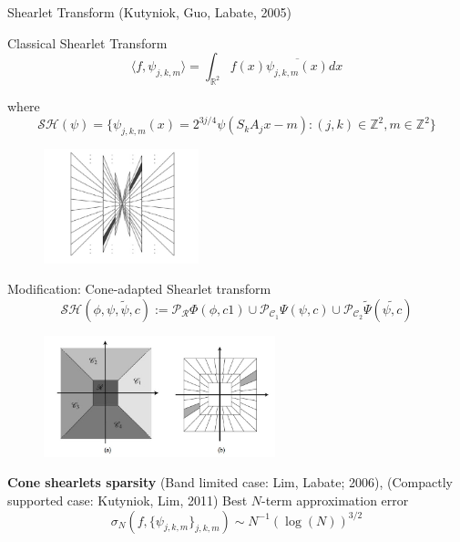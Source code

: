 \begin{frame}{Shearlet Transform (Kutyniok, Guo, Labate, 2005)}
\begin{block}{Classical Shearlet Transform}
$$
\langle f,\psi_{j,k,m}\rangle =\int_{\mathbb{R}^2}f(x)\overline{\psi_{j,k,m}(x)}dx
$$

where
$$
\mathcal{SH}(\psi)=\{\psi_{j,k,m}(x)=2^{3j/4}\psi (S_kA_jx-m):(j,k)\in\mathbb{Z}^2,m\in\mathbb{Z}^2\}
$$
\end{block}

\begin{figure}[h!]
\centering
\includegraphics[width=0.4\textwidth]{./images/tiling_nocone.jpg}
\end{figure}
\end{frame}

\begin{frame}{Modification: Cone-adapted Shearlet transform}
$$
\mathcal{SH}(\phi,\psi,\tilde{\psi},c):=\mathcal{P}_{\mathcal{R}}\Phi(\phi,c1)\cup\mathcal{P}_{\mathcal{C}_1}\Psi(\psi,c)\cup\mathcal{P}_{\mathcal{C}_2}\tilde{\Psi}(\tilde{\psi,c})
$$

\begin{figure}[h!]
\centering
\includegraphics[width=0.6\textwidth]{./images/tiling_cone}
\end{figure}

\pause
\begin{block}{\textbf{Cone shearlets sparsity} (Band limited case: Lim, Labate; 2006), (Compactly supported case: Kutyniok, Lim, 2011)}
Best $N$-term approximation error
$$
\sigma_N(f,\{\psi_{j,k,m}\}_{j,k,m})\sim N^{-1}(\log(N))^{3/2}
$$
\end{block}
\end{frame}

